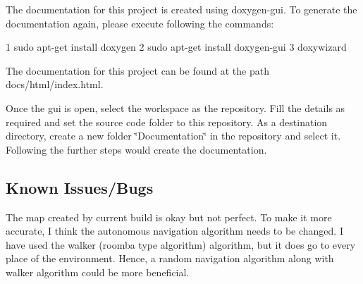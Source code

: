 The documentation for this project is created using doxygen-\/gui. To generate the documentation again, please execute following the commands\+:


\begin{DoxyCode}
1 sudo apt-get install doxygen
2 sudo apt-get install doxygen-gui
3 doxywizard
\end{DoxyCode}


The documentation for this project can be found at the path docs/html/index.\+html.

Once the gui is open, select the workspace as the repository. Fill the details as required and set the source code folder to this repository. As a destination directory, create a new folder \char`\"{}\+Documentation\char`\"{} in the repository and select it. Following the further steps would create the documentation.

\subsection*{Known Issues/\+Bugs}

The map created by current build is okay but not perfect. To make it more accurate, I think the autonomous navigation algorithm needs to be changed. I have used the walker (roomba type algorithm) algorithm, but it does go to every place of the environment. Hence, a random navigation algorithm along with walker algorithm could be more beneficial. 